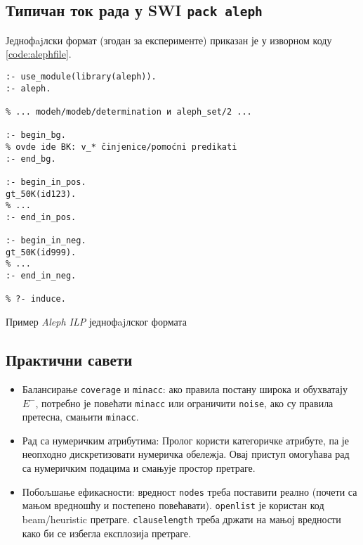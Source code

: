 \subsection{Типичан ток рада у SWI \texttt{pack aleph}}
Једнофajлски формат (згодан за експерименте) приказан је у изворном коду \ref{code:alephfile}.
\begin{listing}[H]
\begin{verbatim}
:- use_module(library(aleph)).
:- aleph.

% ... modeh/modeb/determination и aleph_set/2 ...

:- begin_bg.
% ovde ide BK: v_* činjenice/pomoćni predikati
:- end_bg.

:- begin_in_pos.
gt_50K(id123).
% ...
:- end_in_pos.

:- begin_in_neg.
gt_50K(id999).
% ...
:- end_in_neg.

% ?- induce.
\end{verbatim}
\caption{Пример \emph{Aleph ILP} једнофajлског формата}
\label{code:alephfile}
\end{listing}

\subsection{Практични савети}
\begin{itemize}
  \item Балансирање \texttt{coverage} и \texttt{minacc}: ако правила постану широка и обухватају \(E^-\), потребно је повећати \verb|minacc| или ограничити \verb|noise|, ако су правила претесна, смањити \verb|minacc|.
  \item Рад са нумеричким атрибутима: Пролог користи категоричке атрибуте, па је неопходно дискретизовати нумеричка обележја. Овај приступ омогућава рад са нумеричким подацима и смањује простор претраге.
  \item Побољшање ефикасности: вредност \verb|nodes| треба поставити реално (почети са мањом вредношћу и постепено повећавати). \verb|openlist| је користан код beam/heuristic претраге. \verb|clauselength| треба држати на мањој вредности како би се избегла експлозија претраге. \cite{aleph_manual}
\end{itemize}



